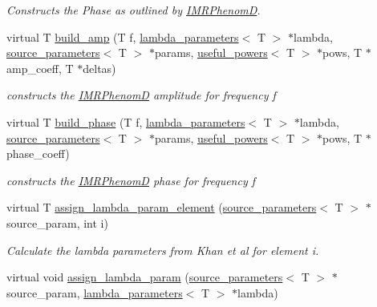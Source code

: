 \begin{DoxyCompactItemize}
\begin{DoxyCompactList}\small\item\em Constructs the Phase as outlined by \hyperlink{classIMRPhenomD}{I\+M\+R\+PhenomD}. \end{DoxyCompactList}\item 
virtual T \hyperlink{classIMRPhenomD_acf5645dc97b020ef468149883d1aca50}{build\+\_\+amp} (T f, \hyperlink{structlambda__parameters}{lambda\+\_\+parameters}$<$ T $>$ $\ast$lambda, \hyperlink{structsource__parameters}{source\+\_\+parameters}$<$ T $>$ $\ast$params, \hyperlink{structuseful__powers}{useful\+\_\+powers}$<$ T $>$ $\ast$pows, T $\ast$amp\+\_\+coeff, T $\ast$deltas)
\begin{DoxyCompactList}\small\item\em constructs the \hyperlink{classIMRPhenomD}{I\+M\+R\+PhenomD} amplitude for frequency f \end{DoxyCompactList}\item 
virtual T \hyperlink{classIMRPhenomD_a03ecb320683b9d2b6df6e943fc55cec7}{build\+\_\+phase} (T f, \hyperlink{structlambda__parameters}{lambda\+\_\+parameters}$<$ T $>$ $\ast$lambda, \hyperlink{structsource__parameters}{source\+\_\+parameters}$<$ T $>$ $\ast$params, \hyperlink{structuseful__powers}{useful\+\_\+powers}$<$ T $>$ $\ast$pows, T $\ast$phase\+\_\+coeff)
\begin{DoxyCompactList}\small\item\em constructs the \hyperlink{classIMRPhenomD}{I\+M\+R\+PhenomD} phase for frequency f \end{DoxyCompactList}\item 
\mbox{\label{classIMRPhenomD_a551588d127597037000512cfafa42673}} 
virtual T \hyperlink{classIMRPhenomD_a551588d127597037000512cfafa42673}{assign\+\_\+lambda\+\_\+param\+\_\+element} (\hyperlink{structsource__parameters}{source\+\_\+parameters}$<$ T $>$ $\ast$source\+\_\+param, int i)
\begin{DoxyCompactList}\small\item\em Calculate the lambda parameters from Khan et al for element i. \end{DoxyCompactList}\item 
\mbox{\label{classIMRPhenomD_ae14db26ad43c3b7b4a2a962a0af5ff24}} 
virtual void \hyperlink{classIMRPhenomD_ae14db26ad43c3b7b4a2a962a0af5ff24}{assign\+\_\+lambda\+\_\+param} (\hyperlink{structsource__parameters}{source\+\_\+parameters}$<$ T $>$ $\ast$source\+\_\+param, \hyperlink{structlambda__parameters}{lambda\+\_\+parameters}$<$ T $>$ $\ast$lambda)

\end{DoxyCompactItemize}
